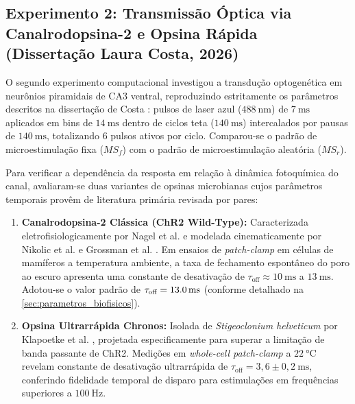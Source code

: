 \documentclass[11pt,a4paper,article,brazil]{abntex2}
\begin{document}
\subsection{Experimento 2: Transmissão Óptica via Canalrodopsina-2 e Opsina Rápida (Dissertação Laura Costa, 2026)}

O segundo experimento computacional investigou a transdução optogenética em neurônios piramidais de CA3 ventral, reproduzindo estritamente os parâmetros descritos na dissertação de Costa \cite{costa2026}: pulsos de laser azul ($\qty{488}{\nano\meter}$) de $\qty{7}{\milli\second}$ aplicados em bins de $\qty{14}{\milli\second}$ dentro de ciclos teta ($\qty{140}{\milli\second}$) intercalados por pausas de $\qty{140}{\milli\second}$, totalizando 6 pulsos ativos por ciclo. Comparou-se o padrão de microestimulação fixa ($MS_f$) com o padrão de microestimulação aleatória ($MS_r$).

Para verificar a dependência da resposta em relação à dinâmica fotoquímica do canal, avaliaram-se duas variantes de opsinas microbianas cujos parâmetros temporais provêm de literatura primária revisada por pares:
\begin{enumerate}
    \item \textbf{Canalrodopsina-2 Clássica (ChR2 Wild-Type):} Caracterizada eletrofisiologicamente por Nagel et al. \cite{nagel2003} e modelada cinematicamente por Nikolic et al. \cite{nikolic2009} e Grossman et al. \cite{grossman2011}. Em ensaios de \emph{patch-clamp} em células de mamíferos a temperatura ambiente, a taxa de fechamento espontâneo do poro ao escuro apresenta uma constante de desativação de $\tau_{\text{off}} \approx \qty{10}{\milli\second}$ a $\qty{13}{\milli\second}$. Adotou-se o valor padrão de $\tau_{\text{off}} = \qty{13{,}0}{\milli\second}$ (conforme detalhado na \cref{sec:parametros_biofisicos}).
    \item \textbf{Opsina Ultrarrápida Chronos:} Isolada de \emph{Stigeoclonium helveticum} por Klapoetke et al. \cite{klapoetke2014}, projetada especificamente para superar a limitação de banda passante de ChR2. Medições em \emph{whole-cell patch-clamp} a $\qty{22}{\degreeCelsius}$ revelam constante de desativação ultrarrápida de $\tau_{\text{off}} = 3{,}6 \pm 0{,}2\ \unit{\milli\second}$, conferindo fidelidade temporal de disparo para estimulações em frequências superiores a $\qty{100}{\hertz}$.
\end{enumerate}
\end{document}

